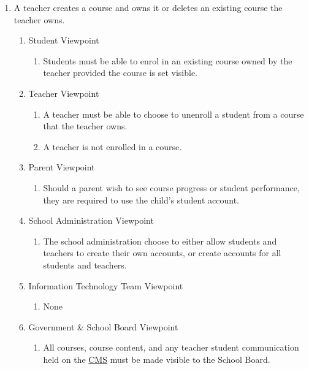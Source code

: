 \documentclass[]{article}
\begin{document}
\begin{enumerate}[{BE}1.]
	\item A teacher creates a course and owns it or deletes an existing course the teacher owns.
	\begin{enumerate}[{VP1}.1]
		\item Student Viewpoint
			\begin{enumerate}
				\item Students must be able to enrol in an existing course owned by the teacher provided the course is set visible.
			\end{enumerate}
		\item Teacher Viewpoint
			\begin{enumerate}
				\item A teacher must be able to choose to unenroll a student from a course that the teacher owns.
				\item A teacher is not enrolled in a course.
			\end{enumerate}
		\item Parent Viewpoint
			\begin{enumerate}
				\item \*\*\*\*\* Should a parent wish to see course progress or student performance, they are required to use the child's student account.
			\end{enumerate}
		\item School Administration Viewpoint
			\begin{enumerate}
				\item The school administration  choose to either allow students and teachers to create their own accounts, or create accounts for all students and teachers.
			\end{enumerate}
		\item Information Technology Team Viewpoint
			\begin{enumerate}
				\item None
			\end{enumerate}
		\item Government \& School Board Viewpoint
			\begin{enumerate}
				\item All courses, course content, and any teacher student communication
          held on the \underline{CMS} must be made visible to the School Board.
			\end{enumerate}
	\end{enumerate}


\end{enumerate}
\end{document}
